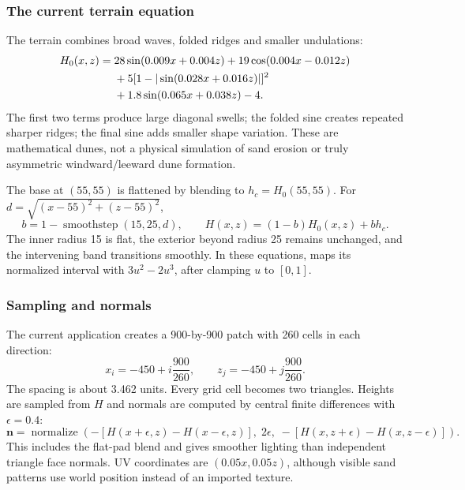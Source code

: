 \subsubsection{The current terrain equation}
The terrain combines broad waves, folded ridges and smaller undulations:
\begin{align}
H_0(x,z)={}&28\sin(0.009x+0.004z)+19\cos(0.004x-0.012z)\notag\\
&+5[1-|\sin(0.028x+0.016z)|]^2\notag\\
&+1.8\sin(0.065x+0.038z)-4.
\end{align}
The first two terms produce large diagonal swells; the folded sine creates repeated sharper ridges; the final sine adds smaller shape variation. These are mathematical dunes, not a physical simulation of sand erosion or truly asymmetric windward/leeward dune formation.

The base at $(55,55)$ is flattened by blending to $h_c=H_0(55,55)$. For $d=\sqrt{(x-55)^2+(z-55)^2}$,
\begin{equation}
b=1-\operatorname{smoothstep}(15,25,d),\qquad H(x,z)=(1-b)H_0(x,z)+bh_c.
\end{equation}
The inner radius 15 is flat, the exterior beyond radius 25 remains unchanged, and the intervening band transitions smoothly. In these equations,  maps its normalized interval with $3u^2-2u^3$, after clamping $u$ to $[0,1]$.

\subsubsection{Sampling and normals}
The current application creates a 900-by-900 patch with 260 cells in each direction:
\begin{equation}
x_i=-450+i\frac{900}{260},\qquad z_j=-450+j\frac{900}{260}.
\end{equation}
The spacing is about 3.462 units. Every grid cell becomes two triangles. Heights are sampled from $H$ and normals are computed by central finite differences with $\epsilon=0.4$:
\begin{equation}
\mathbf n=\operatorname{normalize}\left(
-[H(x+\epsilon,z)-H(x-\epsilon,z)],\;2\epsilon,\;
-[H(x,z+\epsilon)-H(x,z-\epsilon)]\right).
\end{equation}
This includes the flat-pad blend and gives smoother lighting than independent triangle face normals. UV coordinates are $(0.05x,0.05z)$, although visible sand patterns use world position instead of an imported texture.

